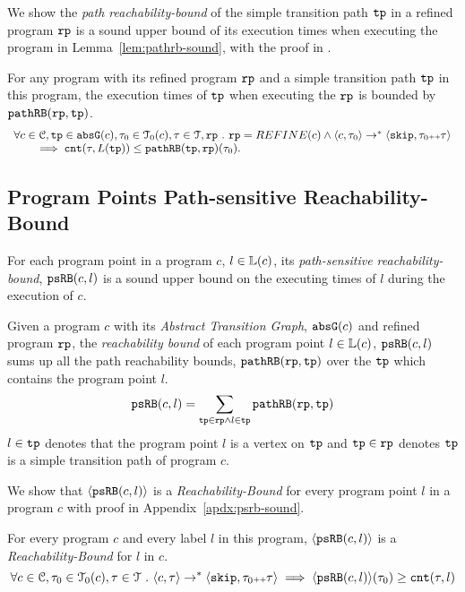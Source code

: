 We show the \emph{path reachability-bound} of the simple transition path $\mathtt{tp}$ in a refined program $\mathtt{rp}$ is a sound upper bound of its execution times when executing the program in Lemma~\ref{lem:pathrb-sound}, with the proof in .
\begin{lem}
  \label{lem:pathrb-sound}
  For any program with its refined program $\mathtt{rp}$ and a simple transition path $\mathtt{tp}$ in this program,
  the execution times of $\mathtt{tp}$ when executing the $\mathtt{rp}$ is bounded by $\mathtt{pathRB}(\mathtt{rp}, \mathtt{tp})$.
  \[
    \begin{array}{l}
    \forall c \in \mathcal{C}, \mathtt{tp} \in \mathtt{abs}{\mathtt{G}}(c), \mathtt{\tau}_0 \in \mathcal{T}_0(c), \mathtt{\tau} \in \mathcal{T}, \mathtt{rp} ~.~ 
    \mathtt{rp} = REFINE(c)
    \land
    \langle c, \mathtt{\tau}_0 \rangle \to^* 
    \langle {\ensuremath{\mathtt{skip}}, \ensuremath{\mathtt{\tau}}_0 {\scriptscriptstyle ++}\ensuremath{\mathtt{\tau}}} \rangle
    \\ \qquad
    \implies
    \mathtt{cnt}(\mathtt{\tau}, L(\mathtt{tp})) \leq \mathtt{pathRB}(\mathtt{tp}, \mathtt{rp})(\mathtt{\tau}_0).
    \end{array}
    \]
  \end{lem}

\subsection{Program Points Path-sensitive Reachability-Bound}
\label{sec:point-psrb}
For each program point in a program $c$, $l \in \mathbb{L}(c)$,
its \emph{path-sensitive reachability-bound}, $\mathtt{psRB}(c, l)$ is a sound upper bound on the executing times of $l$ during the execution of $c$.
%
 \begin{defn}
  \label{def:point_psrb}
  Given a program $c$ with its \emph{Abstract Transition Graph}, $\mathtt{abs}{\mathtt{G}}(c)$ and refined program $\mathtt{rp}$,
  the \emph{reachability bound} of each program point $l \in \mathbb{L}(c)$, $\mathtt{psRB}(c, l)$ 
  sums up all the path reachability bounds, $\mathtt{pathRB}(\mathtt{rp}, \mathtt{tp})$ over the $\mathtt{tp}$ which contains the program point $l$.
  \[ 
    \mathtt{psRB}(c, l) = 
    \sum\limits_{\mathtt{tp} \in \mathtt{rp} \land 
  l \in \mathtt{tp}} 
  \mathtt{pathRB}(\mathtt{rp}, \mathtt{tp})
  \]
  $l \in \mathtt{tp}$ denotes that the program point $l$ is a vertex on $\mathtt{tp}$ 
  and $\mathtt{tp} \in \mathtt{rp}$ denotes $\mathtt{tp}$ is a simple transition path of program $c$.
 \end{defn}
We show that $\langle \mathtt{psRB}(c, l) \rangle$ is a \emph{Reachability-Bound} for every program point $l$ in a program $c$ with proof in Appendix~\ref{apdx:psrb-sound}.
\begin{thm}
    \label{thm:pathsensitive_rb_soundness}
  For every program ${c}$ and every label $l$ in this program,
  $\langle \mathtt{psRB}(c, l) \rangle$ is a \emph{Reachability-Bound} for $l$ in $c$.
  \[
    \forall c \in \mathcal{C}, \mathtt{\tau}_0 \in \mathcal{T}_0(c), \mathtt{\tau} \in \mathcal{T} ~.~ 
    \langle {c}, \mathtt{\tau} \rangle \to^{*} \langle \mathtt{skip}, \mathtt{\tau}_0 {\scriptscriptstyle ++} \mathtt{\tau} \rangle 
    \implies \langle \mathtt{psRB}(c, l) \rangle(\mathtt{\tau}_0) \geq \mathtt{cnt}(\mathtt{\tau}, l) 
    \]
  \end{thm}
